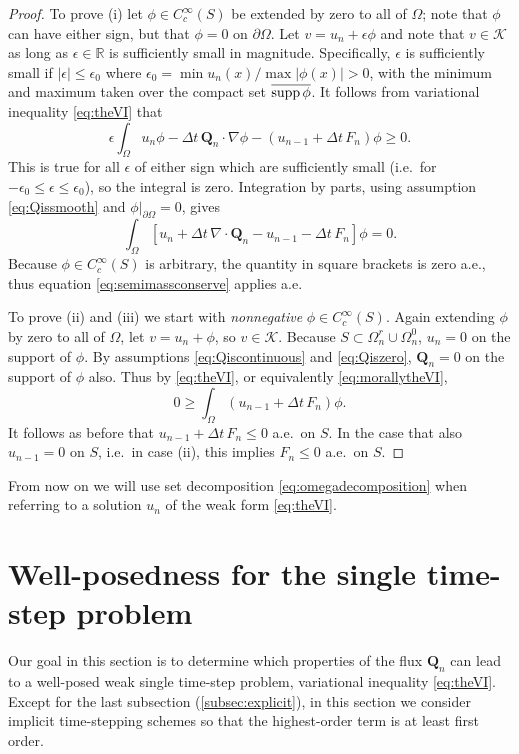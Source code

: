 \documentclass[final,leqno,onefignum,onetabnum]{siamltex1213bueler}
\newcommand\bQ{\mathbf{Q}}
\newcommand{\Div}{\nabla\cdot}
\newcommand\eps{\epsilon}
\renewcommand{\grad}{\nabla}
\newcommand\RR{\mathbb{R}}
\begin{document}
\medskip
\begin{proof}  To prove (i) let $\phi\in C_c^\infty(S)$ be extended by zero to all of $\Omega$; note that $\phi$ can have either sign, but that $\phi=0$ on $\partial\Omega$.  Let $v = u_n + \eps \phi$ and note that $v \in \mathcal{K}$ as long as $\eps\in\RR$ is sufficiently small in magnitude.  Specifically, $\eps$ is sufficiently small if $|\eps|\le \eps_0$ where $\eps_0 = \min u_n(x) / \max |\phi(x)| > 0$, with the minimum and maximum taken over the compact set $\overline{\supp \phi}$.  It follows from variational inequality \eqref{eq:theVI} that
   $$\eps \int_\Omega u_n \phi - \Delta t\,\bQ_n \cdot \grad \phi - (u_{n-1} + \Delta t\,F_n)\phi \ge 0.$$
This is true for all $\eps$ of either sign which are sufficiently small (i.e.~for $-\eps_0 \le \eps \le \eps_0$), so the integral is zero.  Integration by parts, using assumption \eqref{eq:Qissmooth} and $\phi\big|_{\partial\Omega}=0$, gives
   $$\int_\Omega \left[u_n + \Delta t\,\Div\bQ_n - u_{n-1} - \Delta t\,F_n \right]\phi = 0.$$
Because $\phi\in C_c^\infty(S)$ is arbitrary, the quantity in square brackets is zero a.e., thus equation \eqref{eq:semimassconserve} applies a.e.

To prove (ii) and (iii) we start with \emph{nonnegative} $\phi\in C_c^\infty(S)$.  Again extending $\phi$ by zero to all of $\Omega$, let $v = u_n + \phi$, so $v\in\mathcal{K}$.  Because $S\subset \Omega_n^r\cup\Omega_n^0$, $u_n=0$ on the support of $\phi$.  By assumptions \eqref{eq:Qiscontinuous} and \eqref{eq:Qiszero}, $\bQ_n=0$ on the support of $\phi$ also.  Thus by \eqref{eq:theVI}, or equivalently \eqref{eq:morallytheVI},
    $$0 \ge \int_{\Omega} \left(u_{n-1} + \Delta t\, F_n\right) \phi.$$
It follows as before that $u_{n-1} + \Delta t\, F_n \le 0$ a.e.~on $S$.  In the case that also $u_{n-1}=0$ on $S$, i.e.~in case (ii), this implies $F_n \le 0$ a.e.~on $S$.\end{proof}

\medskip
From now on we will use set decomposition \eqref{eq:omegadecomposition} when referring to a solution $u_n$ of the weak form \eqref{eq:theVI}.


\section{Well-posedness for the single time-step problem} \label{sec:wellposed}  Our goal in this section is to determine which properties of the flux $\bQ_n$ can lead to a well-posed weak single time-step problem, variational inequality \eqref{eq:theVI}.  Except for the last subsection (\ref{subsec:explicit}), in this section we consider implicit time-stepping schemes so that the highest-order term is at least first order.
\end{document}
